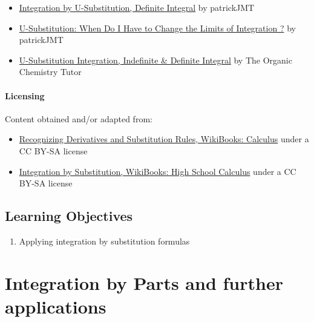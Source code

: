 \begin{itemize}
    \item \href{https://youtu.be/3XOzg2-DdTA}{Integration by U-Substitution, Definite Integral} by patrickJMT
    \item \href{https://youtu.be/FJoyIAIC1Ag}{U-Substitution: When Do I Have to Change the Limits of Integration ?} by patrickJMT
\end{itemize}

\begin{itemize}
    \item \href{https://youtu.be/0A2RlnutO8U}{U-Substitution Integration, Indefinite \& Definite Integral} by The Organic Chemistry Tutor
\end{itemize}

\paragraph{Licensing}

Content obtained and/or adapted from:
\begin{itemize}
    \item \href{https://en.wikibooks.org/wiki/Calculus/Integration_techniques/Recognizing_Derivatives_and_the_Substitution_Rule}{Recognizing Derivatives and Substitution Rules, WikiBooks: Calculus} under a CC BY-SA license
    \item \href{https://en.wikibooks.org/wiki/High_School_Calculus/Integration_by_Substitution}{Integration by Substitution, WikiBooks: High School Calculus} under a CC BY-SA license
\end{itemize}

\subsection{Learning Objectives}

\begin{enumerate}
    \item Applying integration by substitution formulas
\end{enumerate}

\section{Integration by Parts and further applications}
\label{sec:integration-by-parts-and-further-applications}


